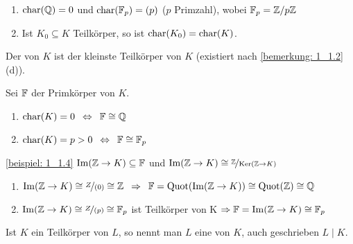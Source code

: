\begin{beispiel} \label{beispiel: 1_1.4}
    \begin{enumerate}[leftmargin=*, label=(\alph*), noitemsep]
        \item $\operatorname{char}(\mathbb{Q}) = 0$ und $\operatorname{char}(\mathbb{F}_p) = (p)$ ($p$ Primzahl), wobei $\mathbb{F}_p = \mathbb{Z} / p \mathbb{Z}$
        \item Ist $K_0 \subseteq K$ Teilkörper, so ist $\operatorname{char}(K_0) = \operatorname{char}(K)$.
    \end{enumerate}
\end{beispiel}

\begin{definition}[Primkörper]
    Der  von $K$ ist der kleinste Teilkörper von $K$ (existiert nach \cref{bemerkung: 1_1.2}(d)).
\end{definition}

\begin{satz} \label{satz: 1_1.6}
    Sei $\mathbb{F}$ der Primkörper von $K$.
    \begin{enumerate}[leftmargin=*, nolistsep, label=(\alph*), topsep=-\parskip]
        \item $\operatorname{char}(K)  = 0 \enskip \Leftrightarrow \enskip \mathbb{F} \mathrel{\cong} \mathbb{Q}$
        \item $\operatorname{char}(K)  = p > 0 \enskip \Leftrightarrow \enskip \mathbb{F} \mathrel{\cong} \mathbb{F}_p$
    \end{enumerate}
\end{satz}
\begin{proof_equiv}
    \rueckrichtung \cref{beispiel: 1_1.4}
    \hinrichtung $\operatorname{Im}(\mathbb{Z} \to K) \subseteq \mathbb{F}$ und $\Image(\Z \to K) \isomorph \lfrac{\Z}{\Ker(\Z \to K)}$
    \begin{enumerate}[label=(\alph*), leftmargin=*]
        \item $\Image(\Z \to K) \isomorph \lfrac{Z}{(0)} \isomorph \Z \follows \F = \Quot(\Image(\Z \to K)) \isomorph \Quot(\Z) \isomorph \Q$
        \item $\Image(\Z \to K) \isomorph \lfrac{Z}{(p)} \isomorph \F_p$ ist Teilkörper von K $\Rightarrow \mathbb{F} = \operatorname{Im}(\mathbb{Z} \to K) \mathrel{\cong} \mathbb{F}_p$
    \end{enumerate}
\end{proof_equiv}

\begin{definition}[Körpererweiterung]
    Ist $K$ ein Teilkörper von $L$, so nennt man $L$ eine  von $K$, auch geschrieben $L \mid K$.
\end{definition}

